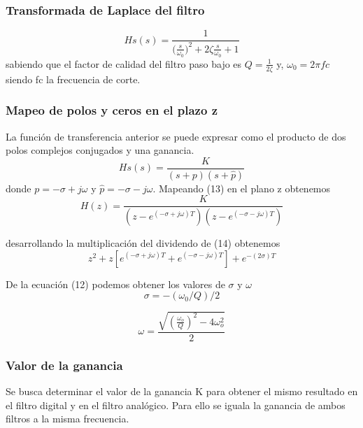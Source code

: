 \documentclass[titlepage]{article}
\begin{document}
\subsubsection{Transformada de Laplace del filtro}
\begin{equation}
Hs(s)=\frac{1}{\displaystyle{(\frac{s}{\omega_0}})^2+2\zeta\frac{s}{\omega_0}+1}
\end{equation}
sabiendo que el factor de calidad del filtro paso bajo es $Q=\displaystyle\frac{1}{2\zeta}$ y, $\omega_0=2{\pi}fc$ siendo fc la frecuencia de corte.
\subsubsection{Mapeo de polos y ceros en el plazo z}
La función de transferencia anterior se puede expresar como el producto de dos polos complejos conjugados y una ganancia.  
\begin{equation}
Hs(s)=\frac{K}{\displaystyle(s+p)(s+\hat{p})}
\end{equation}
donde  $p=-\sigma+j\omega$ y $\hat{p}=-\sigma-j\omega$.
Mapeando (13) en el plano z obtenemos
\begin{equation}
H(z)=\frac{K}{\displaystyle(z-e^{(-\sigma+j\omega)T})(z-e^{(-\sigma-j\omega)T})}
\end{equation}

desarrollando la multiplicación del dividendo de (14) obtenemos
\begin{equation}
z^2+z[e^{(-\sigma+j\omega)T}+e^{(-\sigma-j\omega)T}]+e^{-(2\sigma)T}  
\end{equation}


De la ecuación (12) podemos obtener los valores de $\sigma$ y $\omega$
\begin{equation}
\sigma=-(\omega_0/Q)/2
\end{equation}

\begin{equation}
\omega=\frac{\sqrt{(\frac{\displaystyle\omega_o}{Q})^2-4\omega_o^2}}{2}
\end{equation}

\subsubsection{Valor de la ganancia}
Se busca determinar el valor de la ganancia K para obtener el mismo resultado en el filtro digital y en el filtro analógico. Para ello se iguala la ganancia de ambos filtros a la misma frecuencia.
\end{document}
